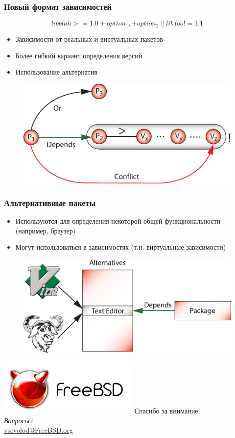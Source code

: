 \documentclass{beamer}
\begin{document}
\begin{frame}
\frametitle{Новый формат зависимостей}
\large{\[libblah >= 1.0 +option_1, +option_2 \| libfoo != 1.1\]}
\begin{itemize}
  \item Зависимости от реальных и виртуальных пакетов
  \item Более гибкий вариант определения версий
  \item Использование альтернатив
\end{itemize}
\begin{figure}[h!]
  \centering
  \includegraphics[height=0.3\textheight]{q6.eps}
\end{figure}
\end{frame}

\begin{frame}
\frametitle{Альтернативные пакеты}
\begin{itemize}
  \item Используются для определения некоторой общей функциональности
  (например, браузер)
  \item Могут использоваться в зависимостях (т.н. виртуальные зависимости)
\end{itemize}
\begin{figure}[h!]
  \centering
  \includegraphics[height=0.4\textheight]{q7.eps}
\end{figure}
\end{frame}

\begin{frame}
\begin{center}
\includegraphics{logo.pdf}
{\Large Спасибо за внимание!} \\
\emph{Вопросы?} \\[4pt]
\url{vsevolod@FreeBSD.org}
\end{center}
\end{frame}
\end{document}
